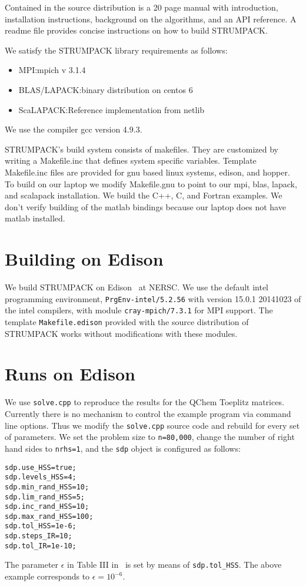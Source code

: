 \documentclass{acmsmall}
\begin{document}
Contained in the source distribution is a 20 page manual with
introduction, installation instructions, background on the
algorithms, and an API reference.  A readme file
provides concise instructions on how to build STRUMPACK.

We satisfy the STRUMPACK library requirements as follows:
\begin{itemize}
\item MPI:\@ mpich v 3.1.4
\item BLAS/LAPACK:\@ binary distribution on centos 6
\item ScaLAPACK:\@ Reference implementation from netlib~\cite{netlib}
\end{itemize}

We use the compiler gcc version 4.9.3.

STRUMPACK's build system consists of makefiles.  They are
customized by writing a Makefile.inc that defines system specific
variables.  Template Makefile.inc files are provided for gnu
based linux systems, edison, and hopper.  To build on our laptop
we modify Makefile.gnu to point to our mpi, blas, lapack, and
scalapack installation.  We build the C++, C, and Fortran
examples.  We don't verify building of the matlab bindings
because our laptop does not have matlab installed.


\section{Building on Edison}

We build STRUMPACK on Edison~\cite{edison} at NERSC.  We use the
default intel programming environment, \verb!PrgEnv-intel/5.2.56!
with version 15.0.1 20141023 of the intel compilers, with module
\verb!cray-mpich/7.3.1! for MPI support.  The template
\verb!Makefile.edison! provided with the source distribution of
STRUMPACK works without modifications with these modules.


\section{Runs on Edison}

We use \verb!solve.cpp! to reproduce the results for the QChem Toeplitz
matrices.  Currently there is no mechanism to control the example
program via command line options.  Thus we modify the
\verb!solve.cpp! source code and rebuild for every set of
parameters.  We set the problem size to \verb!n=80,000!, change the
number of right hand sides to \verb!nrhs=1!, and the \verb!sdp!
object is configured as follows:
\begin{verbatim}
sdp.use_HSS=true;
sdp.levels_HSS=4;
sdp.min_rand_HSS=10;
sdp.lim_rand_HSS=5;
sdp.inc_rand_HSS=10;
sdp.max_rand_HSS=100;
sdp.tol_HSS=1e-6;
sdp.steps_IR=10;
sdp.tol_IR=1e-10;
\end{verbatim}
The parameter $\epsilon$ in Table III in~\cite{strumpack} is set
by means of \verb!sdp.tol_HSS!.  The above example corresponds to
$\epsilon=10^{-6}$.
\end{document}
